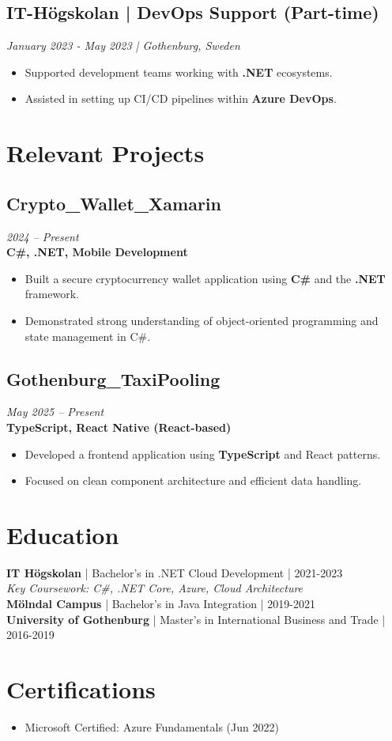 \documentclass[11pt,a4paper]{article}
\begin{document}
\subsection*{IT-Högskolan | DevOps Support (Part-time)}
\textit{January 2023 - May 2023 | Gothenburg, Sweden}
\begin{itemize}[noitemsep]
\item Supported development teams working with \textbf{.NET} ecosystems.
\item Assisted in setting up CI/CD pipelines within \textbf{Azure DevOps}.
\end{itemize}

\section*{Relevant Projects}

\subsection{Crypto\_Wallet\_Xamarin}
\textit{2024 -- Present} \\
\textbf{C\#, .NET, Mobile Development}
\begin{itemize}[noitemsep]
  \item Built a secure cryptocurrency wallet application using \textbf{C\#} and the \textbf{.NET} framework.
  \item Demonstrated strong understanding of object-oriented programming and state management in C\#.
\end{itemize}

\subsection{Gothenburg\_TaxiPooling}
\textit{May 2025 -- Present} \\
\textbf{TypeScript, React Native (React-based)}
\begin{itemize}[noitemsep]
  \item Developed a frontend application using \textbf{TypeScript} and React patterns.
  \item Focused on clean component architecture and efficient data handling.
\end{itemize}

\vspace{6pt}
\section*{Education}
\textbf{IT Högskolan} | Bachelor's in .NET Cloud Development | 2021-2023\\
\textit{Key Coursework: C#, .NET Core, Azure, Cloud Architecture}\\
\textbf{Mölndal Campus} | Bachelor's in Java Integration | 2019-2021\\
\textbf{University of Gothenburg} | Master's in International Business and Trade | 2016-2019

\vspace{6pt}
\section*{Certifications}
\begin{itemize}
\item Microsoft Certified: Azure Fundamentals (Jun 2022)
\end{itemize}
\end{document}
